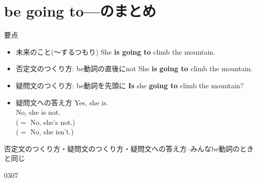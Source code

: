 \documentclass[aspectratio=169,xcolor={dvipsnames,table}]{beamer}
\newcommand{\myaudio}[1]{\href{#1}{\faVolumeUp}}
\begin{document}
\section{be going to---のまとめ}
\begin{frame}[plain]{要点}
 
\begin{block}{}
\begin{itemize}[square]\small
 \item 未来のこと(～するつもり)%
\hfill{She {\bfseries is going to} climb the mountain.}
 \item 否定文のつくり方: be動詞の直後にnot
\hfill{}{She {\bfseries is}  {\bfseries going to} climb the mountain.}
 \item 疑問文のつくり方: be動詞を先頭に
\hfill{}{{\bfseries Is} she {\bfseries going to} climb the mountain?}
 \item 疑問文への答え方
\hfill{}Yes, she is.\\
\hfill{}No, she is not.\\
\hfill{}($=$ No, she's not.)\\
\hfill{}($=$ No, she isn't.)
\end{itemize}
\end{block}
\hfill{{\scriptsize 否定文のつくり方・疑問文のつくり方・疑問文への答え方--みんなbe動詞のときと同じ}}

\hfill{\tiny 0307}\,{\scriptsize \myaudio{./audio/011_be_going_to_10.mp3}}
\end{frame}
\end{document}

